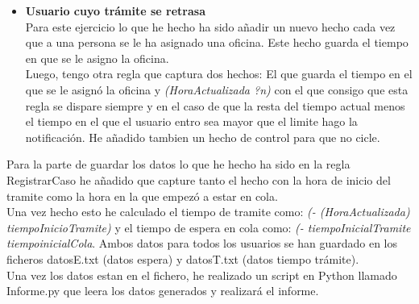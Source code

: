 \documentclass[10pt,spanish]{article}
\begin{document}
\begin{itemize}
		\item \textbf{Usuario cuyo trámite se retrasa}\\
		Para este ejercicio lo que he hecho ha sido añadir un nuevo hecho cada vez que a una persona se le ha asignado una oficina. Este hecho guarda el tiempo en que se le asigno la oficina.\\
		Luego, tengo otra regla que captura dos hechos: El que guarda el tiempo en el que se le asignó la oficina y \textit{(HoraActualizada ?n)} con el que consigo que esta regla se dispare siempre y en el caso de que la resta del tiempo actual menos el tiempo en el que el usuario entro sea mayor que el limite hago la notificación.
		He añadido tambien un hecho de control para que no cicle.
	\end{itemize}
	Para la parte de guardar los datos lo que he hecho ha sido en la regla RegistrarCaso he añadido que capture tanto el hecho con la hora de inicio del tramite como la hora en la que empezó a estar en cola. \\
	Una vez hecho esto he calculado el tiempo de tramite como: \textit{(- (HoraActualizada) tiempoInicioTramite)} y el tiempo de espera en cola como: \textit{(- tiempoInicialTramite tiempoinicialCola}.
	Ambos datos para todos los usuarios se han guardado en los ficheros datosE.txt (datos espera) y datosT.txt (datos tiempo trámite).
	\\Una vez los datos estan en el fichero, he realizado un script en Python llamado Informe.py que leera los datos generados y realizará el informe.
	\pagebreak
\end{document}

